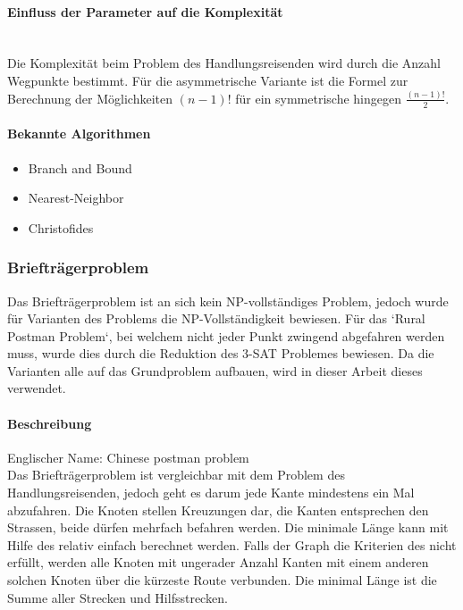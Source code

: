 	\paragraph{Einfluss der Parameter auf die Komplexität}\mbox{}\\
	Die Komplexität beim Problem des Handlungsreisenden wird durch die Anzahl Wegpunkte bestimmt. Für die asymmetrische Variante ist die Formel zur Berechnung der Möglichkeiten $(n-1)!$ 
	für ein symmetrische hingegen $\frac{(n-1)!}{2}$.
	
	 \newpage
	\paragraph{Bekannte Algorithmen}\cite{tsp_algorithmen} \cite{tsp_semesterarbeit} \cite{pomberger2008algorithmen}
	\begin{itemize}
		\item Branch and Bound
		\item Nearest-Neighbor
		\item Christofides
	\end{itemize}

	\subsubsection{Briefträgerproblem}\label{chinese_postman}
	Das Briefträgerproblem ist an sich kein NP-vollständiges Problem, jedoch wurde für Varianten des Problems die NP-Vollständigkeit bewiesen. Für das `Rural Postman Problem`, bei 
	welchem nicht jeder Punkt zwingend abgefahren werden muss, wurde dies durch die Reduktion des 3-SAT Problemes bewiesen. Da die Varianten alle auf das Grundproblem aufbauen, 
	wird in dieser Arbeit dieses verwendet.

	\paragraph{Beschreibung}
	Englischer Name: Chinese postman problem\\
	Das Briefträgerproblem ist vergleichbar mit dem Problem des Handlungsreisenden, jedoch geht es darum jede Kante mindestens ein Mal abzufahren. Die Knoten stellen Kreuzungen dar, 
	die Kanten entsprechen den Strassen, beide dürfen mehrfach befahren werden. Die minimale Länge kann mit Hilfe des  relativ einfach berechnet werden. 
	Falls der Graph die Kriterien des  nicht erfüllt, werden alle Knoten mit ungerader Anzahl Kanten mit einem anderen solchen Knoten über die kürzeste 
	Route verbunden. Die minimal Länge ist die Summe aller Strecken und Hilfsstrecken. \cite{pearson2004decision}

